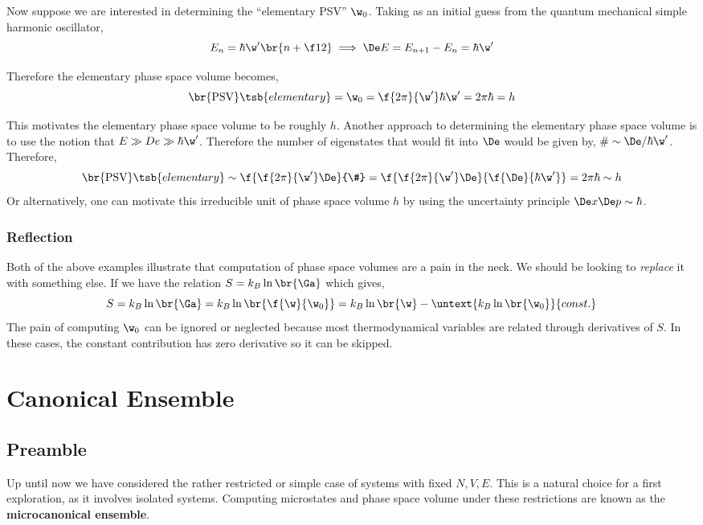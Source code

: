 \documentclass{article}
\begin{document}
Now suppose we are interested in determining the ``elementary PSV'' $\w_0$. Taking as an initial guess from the quantum mechanical simple harmonic oscillator,
\[ E_n = \hbar \w' \br{n + \f12} \implies \De E = E_{n+1} - E_n = \hbar \w' \]

Therefore the elementary phase space volume becomes,
\[ \br{\text{PSV}}\tsb{elementary} = \w_0 = \f{2\pi}{\w'} \hbar \w' = 2 \pi \hbar = h \]

This motivates the elementary phase space volume to be roughly $h$. Another approach to determining the elementary phase space volume is to use the notion that $E \gg De \gg \hbar \w'$. Therefore the number of eigenstates that would fit into $\De$ would be given by, $\# \sim \De / \hbar \w'$. Therefore,
\[ \br{\text{PSV}}\tsb{elementary} \sim  \f{\f{2\pi}{\w'}\De}{\#} = \f{\f{2\pi}{\w'}\De}{\f{\De}{\hbar \w'}} = 2 \pi \hbar \sim h \]
Or alternatively, one can motivate this irreducible unit of phase space volume $h$ by using the uncertainty principle $\De x \De p \sim \hbar$.

\subsubsection{Reflection}
Both of the above examples illustrate that computation of phase space volumes are a pain in the neck. We should be looking to \textit{replace} it with something else. If we have the relation $S = k_B \ln \br{\Ga}$ which gives,
\[ S = k_B \ln \br{\Ga} = k_B \ln \br{\f{\w}{\w_0}} = k_B \ln \br{\w} - \untext{k_B \ln \br{\w_0}}{const.}\]
The pain of computing $\w_0$ can be ignored or neglected because most thermodynamical variables are related through derivatives of $S$. In these cases, the constant contribution has zero derivative so it can be skipped.

\section{Canonical Ensemble}
\subsection{Preamble}
Up until now we have considered the rather restricted or simple case of systems with fixed $N,V,E$. This is a natural choice for a first exploration, as it involves isolated systems. Computing microstates and phase space volume under these restrictions are known as the \textbf{microcanonical ensemble}. \\
\end{document}
